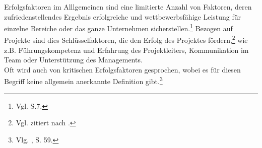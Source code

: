 Erfolgsfaktoren im Alllgemeinen sind eine limitierte Anzahl von Faktoren, deren zufriedenstellendes Ergebnis erfolgreiche und 
wettbewerbsfähige Leistung für einzelne Bereiche oder das ganze Unternehmen sicherstellen.\footnote{Vgl. \cite{Bullen.1981} S.7.}
Bezogen auf Projekte sind dies Schlüsselfaktoren, die den Erfolg des Projektes fördern,\footnote{Vgl. \cite{Buschermohle.2010} zitiert nach \cite{Basten.2012}.} wie
z.B. Führungskompetenz und Erfahrung des Projektleiters, Kommunikation im Team oder Unterstützung des Managements.\\
Oft wird auch von kritischen Erfolgsfaktoren gesprochen, wobei es für diesen Begriff keine allgemein anerkannte Definition gibt.\footnote{Vlg. \cite{Basten.2012}, S. 59.}